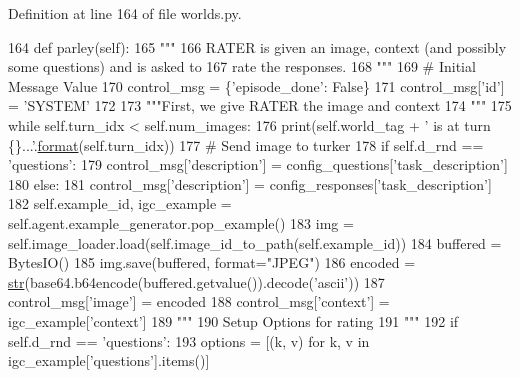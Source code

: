 Definition at line 164 of file worlds.\+py.


\begin{DoxyCode}
164     \textcolor{keyword}{def }parley(self):
165         \textcolor{stringliteral}{"""}
166 \textcolor{stringliteral}{        RATER is given an image, context (and possibly some questions) and is asked to}
167 \textcolor{stringliteral}{        rate the responses.}
168 \textcolor{stringliteral}{        """}
169         \textcolor{comment}{# Initial Message Value}
170         control\_msg = \{\textcolor{stringliteral}{'episode\_done'}: \textcolor{keyword}{False}\}
171         control\_msg[\textcolor{stringliteral}{'id'}] = \textcolor{stringliteral}{'SYSTEM'}
172 
173         \textcolor{stringliteral}{"""First, we give RATER the image and context}
174 \textcolor{stringliteral}{        """}
175         \textcolor{keywordflow}{while} self.turn\_idx < self.num\_images:
176             print(self.world\_tag + \textcolor{stringliteral}{' is at turn \{\}...'}.\hyperlink{namespaceparlai_1_1chat__service_1_1services_1_1messenger_1_1shared__utils_a32e2e2022b824fbaf80c747160b52a76}{format}(self.turn\_idx))
177             \textcolor{comment}{# Send image to turker}
178             \textcolor{keywordflow}{if} self.d\_rnd == \textcolor{stringliteral}{'questions'}:
179                 control\_msg[\textcolor{stringliteral}{'description'}] = config\_questions[\textcolor{stringliteral}{'task\_description'}]
180             \textcolor{keywordflow}{else}:
181                 control\_msg[\textcolor{stringliteral}{'description'}] = config\_responses[\textcolor{stringliteral}{'task\_description'}]
182             self.example\_id, igc\_example = self.agent.example\_generator.pop\_example()
183             img = self.image\_loader.load(self.image\_id\_to\_path(self.example\_id))
184             buffered = BytesIO()
185             img.save(buffered, format=\textcolor{stringliteral}{"JPEG"})
186             encoded = \hyperlink{namespacegenerate__task__READMEs_a5b88452ffb87b78c8c85ececebafc09f}{str}(base64.b64encode(buffered.getvalue()).decode(\textcolor{stringliteral}{'ascii'}))
187             control\_msg[\textcolor{stringliteral}{'image'}] = encoded
188             control\_msg[\textcolor{stringliteral}{'context'}] = igc\_example[\textcolor{stringliteral}{'context'}]
189             \textcolor{stringliteral}{"""}
190 \textcolor{stringliteral}{                Setup Options for rating}
191 \textcolor{stringliteral}{            """}
192             \textcolor{keywordflow}{if} self.d\_rnd == \textcolor{stringliteral}{'questions'}:
193                 options = [(k, v) \textcolor{keywordflow}{for} k, v \textcolor{keywordflow}{in} igc\_example[\textcolor{stringliteral}{'questions'}].items()]

\end{DoxyCode}
